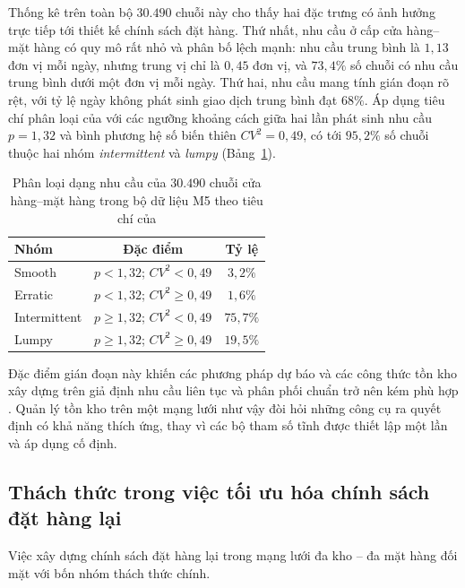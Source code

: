Thống kê trên toàn bộ $30.490$ chuỗi này cho thấy hai đặc trưng có ảnh hưởng
trực tiếp tới thiết kế chính sách đặt hàng. Thứ nhất, nhu cầu ở cấp cửa
hàng--mặt hàng có quy mô rất nhỏ và phân bố lệch mạnh: nhu cầu trung bình là
$1{,}13$ đơn vị mỗi ngày, nhưng trung vị chỉ là $0{,}45$ đơn vị, và $73{,}4\%$
số chuỗi có nhu cầu trung bình dưới một đơn vị mỗi ngày. Thứ hai, nhu cầu mang
tính gián đoạn rõ rệt, với tỷ lệ ngày không phát sinh giao dịch trung bình đạt
$68\%$. Áp dụng tiêu chí phân loại của \textcite{syntetos2005categorization} với
các ngưỡng khoảng cách giữa hai lần phát sinh nhu cầu $p = 1{,}32$ và bình
phương hệ số biến thiên $CV^2 = 0{,}49$, có tới $95{,}2\%$ số chuỗi thuộc hai
nhóm \textit{intermittent} và \textit{lumpy}
(Bảng~\ref{tab:phanloainhucau}).

\begin{table}[htbp]
    \centering
    \caption{Phân loại dạng nhu cầu của $30.490$ chuỗi cửa hàng--mặt hàng trong
    bộ dữ liệu M5 theo tiêu chí của \textcite{syntetos2005categorization}}
    \label{tab:phanloainhucau}
    \begin{tabular}{lcc}
        \hline
        \textbf{Nhóm} & \textbf{Đặc điểm} & \textbf{Tỷ lệ} \\
        \hline
        Smooth       & $p < 1{,}32$; $CV^2 < 0{,}49$   & $3{,}2\%$  \\
        Erratic      & $p < 1{,}32$; $CV^2 \ge 0{,}49$ & $1{,}6\%$  \\
        Intermittent & $p \ge 1{,}32$; $CV^2 < 0{,}49$ & $75{,}7\%$ \\
        Lumpy        & $p \ge 1{,}32$; $CV^2 \ge 0{,}49$ & $19{,}5\%$ \\
        \hline
    \end{tabular}
\end{table}

Đặc điểm gián đoạn này khiến các phương pháp dự báo và các công thức tồn kho
xây dựng trên giả định nhu cầu liên tục và phân phối chuẩn trở nên kém phù hợp
\parencite{croston1972, syntetos2005accuracy}. Quản lý tồn kho trên một mạng
lưới như vậy đòi hỏi những công cụ ra quyết định có khả năng thích ứng, thay vì
các bộ tham số tĩnh được thiết lập một lần và áp dụng cố định.

\subsection{Thách thức trong việc tối ưu hóa chính sách đặt hàng lại}
\label{subsec:thachthuc}

Việc xây dựng chính sách đặt hàng lại trong mạng lưới đa kho -- đa mặt hàng đối
mặt với bốn nhóm thách thức chính.

